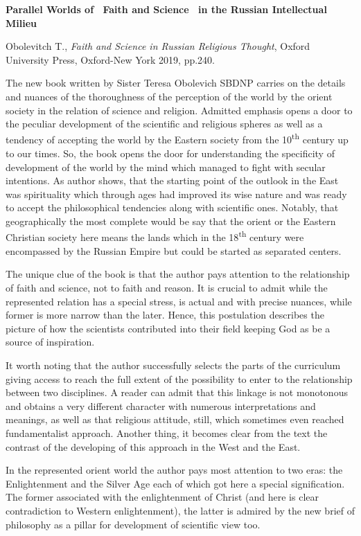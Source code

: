 \documentclass[a4paper]{article}
\title{}
\begin{document}
{\centering\bfseries\color{black}
 Parallel Worlds of ~Faith and Science~ in the Russian Intellectual Milieu
\par}

Obolevitch T., \textit{Faith and Science in Russian Religious Thought}, Oxford University Press, Oxford-New York 2019,
pp.240.

{\color{black}
The new book written by Sister Teresa Obolevich SBDNP carries on the details and nuances of the thoroughness of the
perception of the world by the orient society in the relation of science and religion. Admitted emphasis opens a door
to the peculiar development of the scientific and religious spheres as well as a tendency of accepting the world by the
Eastern society from the 10\textsuperscript{th}  century up to our times. So, the book opens the door for understanding
the specificity of development of the world by the mind which managed to fight with secular intentions. As author
shows, that the starting point of the outlook in the East was spirituality which through ages had improved its wise
nature and was ready to accept the philosophical tendencies along with scientific ones. Notably, that geographically
the most complete would be say that the orient or the Eastern Christian society here means the lands which in the
18\textsuperscript{th} century were encompassed by the Russian Empire but could be started as separated centers.}

{\color{black}
The unique clue of the book is that the author pays attention to the relationship of faith and science, not to faith and
reason. It is crucial to admit while the represented relation has a special stress, is actual and with precise nuances,
while former is more narrow than the later. Hence, this postulation describes the picture of how the scientists
contributed into their field keeping God as be a source of inspiration.}

{\color{black}
It worth noting that the author successfully selects the parts of the curriculum giving access to reach the full extent
of the possibility to enter to the relationship between two disciplines. A reader can admit that this linkage is not
monotonous and obtains a very different character with numerous interpretations and meanings, as well as that religious
attitude, still, which sometimes even reached fundamentalist approach. Another thing, it becomes clear from the text
the contrast of the developing of this approach in the West and the East.}

{\color{black}
In the represented orient world the author pays most attention to two eras: the Enlightenment and the Silver Age each of
which got here a special signification. The former associated with the enlightenment of Christ (and here is clear
contradiction to Western enlightenment), the latter is admired by the new brief of philosophy as a pillar for
development of scientific view too.}
\end{document}
